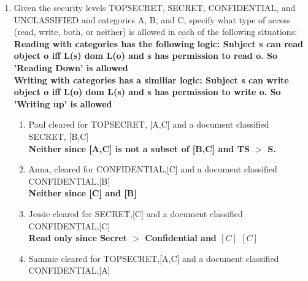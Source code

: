 \documentclass[12pt]{article}
\begin{document}
\renewcommand{\headrulewidth}{0.4pt}

\vspace{-3mm}

\begin{enumerate}

	\item{Given the security levels TOPSECRET, SECRET, CONFIDENTIAL, and UNCLASSIFIED and categories A, B, and C, specify what type of access (read, write, both, or neither) is allowed in each of the following situations:}\\

  \textbf{Reading with categories has the following logic: Subject s can read object o iff L(s) dom L(o) and s has permission to read o. So 'Reading Down' is allowed} \\

  \textbf{Writing with categories has a similiar logic: Subject s can write object o iff L(o) dom L(s) and s has permission to write o. So 'Writing up' is allowed} \\

  \begin{enumerate}
    \item{Paul cleared for TOPSECRET, [A,C] and a document classified SECRET, [B,C]} \\

    \textbf{Neither since [A,C] is not a subset of [B,C] and TS $>$ S.} \\

    \item{Anna, cleared for CONFIDENTIAL,[C] and a document classified CONFIDENTIAL,[B]} \\

    \textbf{Neither since [C] \not\subset [B] and [B] \not\subset [C]} \\

    \item{ Jessie cleared for SECRET,[C] and a document classified CONFIDENTIAL,[C]} \\

    \textbf{Read only since Secret $>$ Confidential and $[C]$ \subset $[C]$} \\

    \item{Sammie cleared for TOPSECRET,[A,C] and a document classified CONFIDENTIAL,[A]} \\


\end{enumerate}
\end{enumerate}
\end{document}
